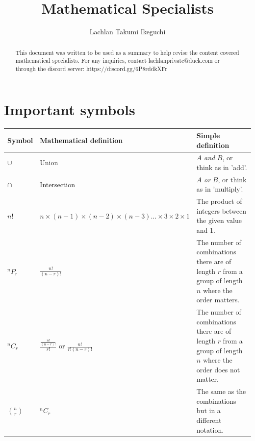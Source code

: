 \documentclass[a4paper,10pt]{report}
\title{Mathematical Specialists}
\author{Lachlan Takumi Ikeguchi}
\begin{document}
\maketitle
\tableofcontents

\begin{abstract}
	This document was written to be used as a summary to help revise the content covered mathematical specialists.  For any inquiries, contact lachlanprivate@duck.com or through the discord server: https://discord.gg/6P8rddkXFr
\end{abstract}

\section{Important symbols}
\begin{center}
	\begin{tabular}{l|lp{6cm}}
		Symbol         & Mathematical definition                                                  & Simple definition                                                                                              \\ \hline
		$\cup$         & Union                                                                    & $A$ \emph{and} $B$, or think as in 'add'.                                                                      \\
		$\cap$         & Intersection                                                             & $A$ \emph{or} $B$, or think as in 'multiply'.                                                                  \\
		$n!$           & $n \times (n-1) \times (n-2) \times (n-3)... \times 3 \times 2 \times 1$ & The product of integers between the given value and 1.                                                         \\
		$^nP_r$        & $\frac{n!}{(n-r)!}$                                                      & The number of combinations there are of length $r$ from a group of length $n$ where the order matters.         \\
		$^nC_r$        & $\frac{\frac{n!}{(n-r)!}}{r!}$ or $\frac{n!}{r!(n - r)!}$                & The number of combinations there are of length $r$ from a group of length $n$ where the order does not matter. \\
		$\binom{n}{r}$ & $^nC_r$                                                                  & The same as the combinations but in a different notation.
	\end{tabular}
\end{center}
\end{document}
